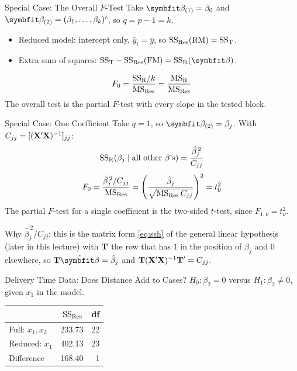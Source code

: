 \begin{frame}{Special Case: The Overall $F$-Test}
    Take $\bbeta_{(1)}=\beta_0$ and $\bbeta_{(2)}=(\beta_1,\dots,\beta_k)'$, so $q=p-1=k$.
    \begin{itemize}
        \item Reduced model: intercept only, $\hat y_i=\bar y$, so $\mathrm{SS}_{\mathrm{Res}}(\mathrm{RM})=\mathrm{SS}_{\mathrm{T}}$.
        \item Extra sum of squares: $\SST-\SSRes(\FM)=\SSR(\bbeta)$.
    \end{itemize}
    \[
    F_0 = \frac{\mathrm{SS}_{\mathrm{R}}/k}{\mathrm{MS}_{\mathrm{Res}}} = \frac{\mathrm{MS}_{\mathrm{R}}}{\mathrm{MS}_{\mathrm{Res}}}
    \]
    The overall test is the partial $F$-test with every slope in the tested block.
\end{frame}


\begin{frame}{Special Case: One Coefficient}
    Take $q=1$, so $\bbeta_{(2)}=\beta_j$. With $C_{jj}=[(\mathbf{X}'\mathbf{X})^{-1}]_{jj}$:
    \[
    \mathrm{SS}_{\mathrm{R}}(\beta_j\mid\text{all other }\beta\text{'s}) = \frac{\hat\beta_j^{\,2}}{C_{jj}}
    \]
    \begin{align*}
        F_0 = \frac{\hat\beta_j^{\,2}/C_{jj}}{\mathrm{MS}_{\mathrm{Res}}} = \left(\frac{\hat\beta_j}{\sqrt{\mathrm{MS}_{\mathrm{Res}}\,C_{jj}}}\right)^{2} = t_0^2
    \end{align*}
    The partial $F$-test for a single coefficient is the two-sided $t$-test, since $F_{1,\nu}=t_\nu^2$.
    \svspace{0.5em}

    Why $\hat\beta_j^{\,2}/C_{jj}$: this is the matrix form \eqref{eq:ssh} of the general linear hypothesis (later in this lecture) with $\mathbf{T}$ the row that has $1$ in the position of $\beta_j$ and $0$ elsewhere, so $\bT\hat{\bbeta}=\hat\beta_j$ and $\mathbf{T}(\mathbf{X}'\mathbf{X})^{-1}\mathbf{T}'=C_{jj}$.
\end{frame}


\begin{frame}{Delivery Time Data: Does Distance Add to Cases?}
    $H_0:\beta_2=0$ versus $H_1:\beta_2\neq0$, given $x_1$ in the model.
    \svspace{0.5em}
    \begin{center}
        \small
        \begin{tabular}{lrr}
            \toprule
            & $\mathrm{SS}_{\mathrm{Res}}$ & df \\
            \midrule
            Full: $x_1,x_2$ & 233.73 & 22 \\
            Reduced: $x_1$ & 402.13 & 23 \\
            \midrule
            Difference & 168.40 & 1 \\
            \bottomrule
        \end{tabular}
    \end{center}
\end{frame}


